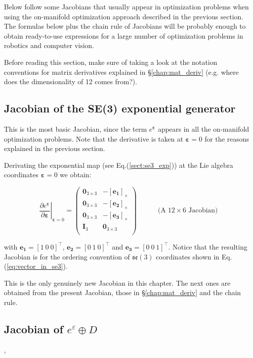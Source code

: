 \documentclass[a4paper,11pt]{report}
\newcommand{\E}{{\bm{\varepsilon}}}
\begin{document}
Below follow some Jacobians that usually appear in optimization problems 
when using the on-manifold optimization approach described in the previous section.
The formulas below plus the chain rule of Jacobians will be probably enough 
to obtain ready-to-use expressions for a large number of optimization problems
in robotics and computer vision.

Before reading this section, make sure of taking a look at the notation conventions
for matrix derivatives explained in \S\ref{chap:mat_deriv} 
(e.g. where does the dimensionality of 12 comes from?).


\subsection{Jacobian of the SE(3) exponential generator}

This is the most basic Jacobian, since the term $e^\E$ appears in all 
the on-manifold optimization problems. 
Note that the derivative is taken at $\E=0$ for the reasons explained 
in the previous section.

Derivating the exponential map (see Eq.(\ref{sect:se3_exp})) at the Lie algebra
coordinates $\E=0$ we obtain:

\begin{equation}
\left. \frac{\partial e^\E}{\partial \E} \right|_{\E=0}
= 
\left(
\begin{array}{cc}
 \mathbf{0}_{3\times 3}  & -[\mathbf{e_1}]_\times \\
 \mathbf{0}_{3\times 3}  & -[\mathbf{e_2}]_\times \\
 \mathbf{0}_{3\times 3}  & -[\mathbf{e_3}]_\times \\
 \mathbf{I}_{3}  & \mathbf{0}_{3\times 3} \\
\end{array}
\right)
\quad\quad\quad \text{(A $12 \times 6$ Jacobian)}
\end{equation}

\noindent with $\mathbf{e_1}=[1 ~ 0 ~ 0]^\top$, 
$\mathbf{e_2}=[0 ~ 1 ~ 0]^\top$ and 
$\mathbf{e_3}=[0 ~ 0 ~ 1]^\top$. 
Notice that the resulting Jacobian is for the 
ordering convention of $\mathfrak{se}(3)$ coordinates shown in Eq.(\ref{eq:vector_in_se3}).

This is the only genuinely new Jacobian in this chapter. 
The next ones are obtained from the present Jacobian, 
those in \S\ref{chap:mat_deriv} and the chain rule.


\subsection{Jacobian of $e^\varepsilon \oplus D$}
\label{sect:jacob_eD}, 
\end{document}
